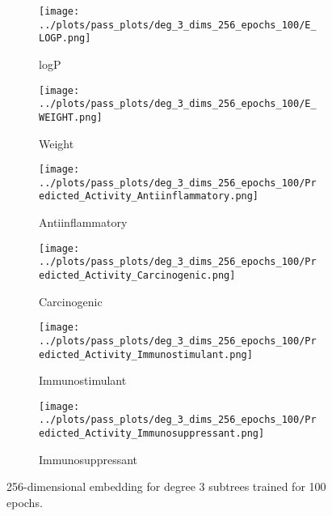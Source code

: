 \begin{figure*}
\centering

\begin{subfigure}{0.45\textwidth}
    \texttt{[image: ../plots/pass\_plots/deg\_3\_dims\_256\_epochs\_100/E\_LOGP.png]}
    \caption{logP}
\end{subfigure}
\begin{subfigure}{0.45\textwidth}
    \texttt{[image: ../plots/pass\_plots/deg\_3\_dims\_256\_epochs\_100/E\_WEIGHT.png]}
    \caption{Weight}
\end{subfigure}
\begin{subfigure}{0.45\textwidth}
    \texttt{[image: ../plots/pass\_plots/deg\_3\_dims\_256\_epochs\_100/Predicted\_Activity\_Antiinflammatory.png]}
    \caption{Antiinflammatory}
\end{subfigure}
\begin{subfigure}{0.45\textwidth}
    \texttt{[image: ../plots/pass\_plots/deg\_3\_dims\_256\_epochs\_100/Predicted\_Activity\_Carcinogenic.png]}
    \caption{Carcinogenic}
\end{subfigure}
\begin{subfigure}{0.45\textwidth}
    \texttt{[image: ../plots/pass\_plots/deg\_3\_dims\_256\_epochs\_100/Predicted\_Activity\_Immunostimulant.png]}
    \caption{Immunostimulant}
\end{subfigure}
\begin{subfigure}{0.45\textwidth}
    \texttt{[image: ../plots/pass\_plots/deg\_3\_dims\_256\_epochs\_100/Predicted\_Activity\_Immunosuppressant.png]}
    \caption{Immunosuppressant}
\end{subfigure}
\caption{256-dimensional embedding for degree 3 subtrees trained for 100 epochs.}
\label{fig:deg_3_dims_256_epochs_100}
\end{figure*}


